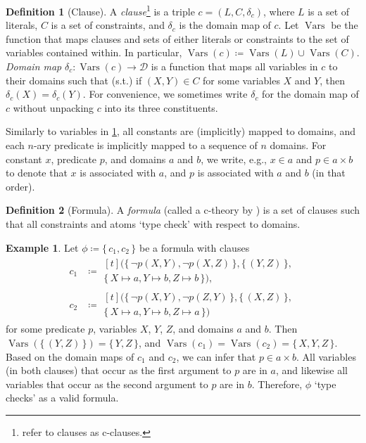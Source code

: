\documentclass[letterpaper]{article} %
\DeclareMathOperator{\Vars}{Vars}
\theoremstyle{definition}
\newtheorem{definition}{Definition}
\newtheorem{example}{Example}
\theoremstyle{remark}
\begin{document}
\begin{definition}[Clause]\label{def:clause}
  A \emph{clause}\footnote{\citet{DBLP:conf/ijcai/BroeckTMDR11} refer to clauses
    as c-clauses.} is a triple $c = (L, C, \delta_c)$, where $L$ is a set of
  literals, $C$ is a set of constraints, and $\delta_c$ is the domain map of
  $c$. Let $\Vars$ be the function that maps clauses and sets of either literals
  or constraints to the set of variables contained within. In particular,
  $\Vars(c) \coloneqq \Vars(L) \cup \Vars(C)$. \emph{Domain map}
  $\delta_{c}\colon \Vars(c) \to \mathcal{D}$ is a function that maps all
  variables in $c$ to their domains such that (s.t.) if $(X, Y) \in C$ for some
  variables $X$ and $Y$, then $\delta_c(X) = \delta_c(Y)$. For convenience, we
  sometimes write $\delta_c$ for the domain map of $c$ without unpacking $c$
  into its three constituents.
\end{definition}

Similarly to variables in \cref{def:clause}, all constants are (implicitly)
mapped to domains, and each $n$-ary predicate is implicitly mapped to a sequence
of $n$ domains. For constant $x$, predicate $p$, and domains $a$ and $b$, we
write, e.g., $x \in a$ and $p \in a \times b$ to denote that $x$ is associated
with $a$, and $p$ is associated with $a$ and $b$ (in that order).

\begin{definition}[Formula]\label{def:formula}
  A \emph{formula} (called a c-theory by \citet{DBLP:conf/ijcai/BroeckTMDR11})
  is a set of clauses such that all constraints and atoms `type check' with
  respect to domains.
\end{definition}

\begin{example}\label{example:first}
  Let $\phi \coloneqq \{\, c_1, c_2 \,\}$ be a formula with clauses
  \begin{align*}
    c_1 &\coloneqq
          \begin{multlined}[t]
            (\{\, \neg p(X, Y), \neg p(X, Z) \,\}, \{\, (Y, Z) \,\}, \\
            \{\, X \mapsto a, Y \mapsto b, Z \mapsto b \,\}),
          \end{multlined}\\
    c_2 &\coloneqq
          \begin{multlined}[t]
            (\{\, \neg p(X, Y), \neg p(Z, Y) \,\}, \{\, (X, Z) \,\}, \\
            \{\, X \mapsto a, Y \mapsto b, Z \mapsto a \,\})
          \end{multlined}
  \end{align*}
  for some predicate $p$, variables $X$, $Y$, $Z$, and domains $a$ and $b$. Then
  $\Vars(\{\, (Y, Z) \,\}) = \{\, Y, Z \,\}$, and
  $\Vars(c_{1}) = \Vars(c_{2}) = \{\, X, Y, Z \,\}$. Based on the domain maps of
  $c_{1}$ and $c_{2}$, we can infer that $p \in a \times b$. All variables (in
  both clauses) that occur as the first argument to $p$ are in $a$, and likewise
  all variables that occur as the second argument to $p$ are in $b$. Therefore,
  $\phi$ `type checks' as a valid formula.
\end{example}
\end{document}
